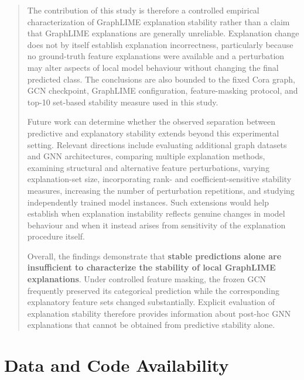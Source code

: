 \documentclass[a4paper]{article}
\begin{document}
\begin{quote}
The contribution of this study is therefore a controlled empirical
characterization of GraphLIME explanation stability rather than a claim
that GraphLIME explanations are generally unreliable. Explanation change
does not by itself establish explanation incorrectness, particularly
because no ground-truth feature explanations were available and a
perturbation may alter aspects of local model behaviour without changing
the final predicted class. The conclusions are also bounded to the fixed
Cora graph, GCN checkpoint, GraphLIME configuration, feature-masking
protocol, and top-10 set-based stability measure used in this study.

Future work can determine whether the observed separation between
predictive and explanatory stability extends beyond this experimental
setting. Relevant directions include evaluating additional graph
datasets and GNN architectures, comparing multiple explanation methods,
examining structural and alternative feature perturbations, varying
explanation-set size, incorporating rank- and coefficient-sensitive
stability measures, increasing the number of perturbation repetitions,
and studying independently trained model instances. Such extensions
would help establish when explanation instability reflects genuine
changes in model behaviour and when it instead arises from sensitivity
of the explanation procedure itself.

Overall, the findings demonstrate that \textbf{stable predictions alone
are insufficient to characterize the stability of local GraphLIME
explanations}. Under controlled feature masking, the frozen GCN
frequently preserved its categorical prediction while the corresponding
explanatory feature sets changed substantially. Explicit evaluation of
explanation stability therefore provides information about post-hoc GNN
explanations that cannot be obtained from predictive stability alone.
\end{quote}

\section{\texorpdfstring{Data and Code Availability
}{Data and Code Availability }}\label{data-and-code-availability}
\end{document}
